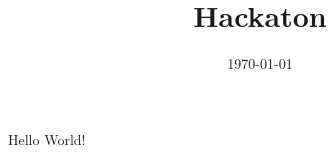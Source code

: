 \documentclass[a4paper]{article}
\title{Hackaton}
\date{\today}
\begin{document}
    \maketitle
    \tableofcontents
    \paragraph{}
    Hello World!
\end{document}
